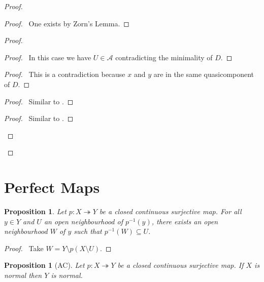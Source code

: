 \documentclass{report}
\let\qed\relax
\newtheorem{prop}[lm]{Proposition}
\theoremstyle{definition}
\newcommand{\inv}[1]{\ensuremath{{#1}^{-1}}}
\begin{document}
\begin{proof}
  \begin{proof}
    \pf\ One exists by Zorn's Lemma.
  \end{proof}
  \begin{proof}
    \begin{proof}
      \pf\ In this case we have $U \in \mathcal{A}$ contradicting the minimality of $D$.
    \end{proof}
    \begin{proof}
      \pf\ This is a contradiction because $x$ and $y$ are in the same quasicomponent of $D$.
    \end{proof}
    \begin{proof}
      \pf\ Similar to .
    \end{proof}
    \begin{proof}
      \pf\ Similar to .
    \end{proof}
  \end{proof}
  \qed
\end{proof}

  \section{Perfect Maps}

    \begin{prop}
      \label{prop:topology:perfect:neighbourhood}
   Let $p : X \twoheadrightarrow Y$ be a closed continuous surjective map. For
   all $y \in Y$ and $U$ an open neighbourhood of $\inv{p}(y)$, there exists an
   open neighbourhood $W$ of $y$ such that $\inv{p}(W) \subseteq U$.
  \end{prop}

  \begin{proof}
   \pf\ Take $W = Y \setminus p(X \setminus U)$. \qed
  \end{proof}

      \begin{prop}[AC]
   Let $p : X \twoheadrightarrow Y$ be a closed continuous surjective map. If
$X$ is normal then $Y$ is normal.
  \end{prop}
\end{document}
